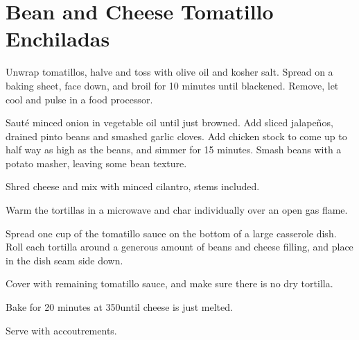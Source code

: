 \section{Bean and Cheese Tomatillo Enchiladas}
\begin{recipe}


Unwrap tomatillos, halve and toss with olive oil and kosher salt. Spread on a
baking sheet, face down, and broil for 10 minutes until blackened. Remove, let
cool and pulse in a food processor.


Sauté minced onion in vegetable oil until just browned. Add sliced jalapeños,
drained pinto beans and smashed garlic cloves. Add chicken stock to come up to
half way as high as the beans, and simmer for 15 minutes. Smash beans with a
potato masher, leaving some bean texture.


Shred cheese and mix with minced cilantro, stems included.


Warm the tortillas in a microwave and char individually over an open gas flame.

Spread one cup of the tomatillo sauce on the bottom of a large casserole dish.
Roll each tortilla around a generous amount of beans and cheese filling, and
place in the dish seam side down.

Cover with remaining tomatillo sauce, and make sure there is no dry tortilla.

Bake for 20 minutes at 350\degree until cheese is just melted.


Serve with accoutrements.

\end{recipe}
